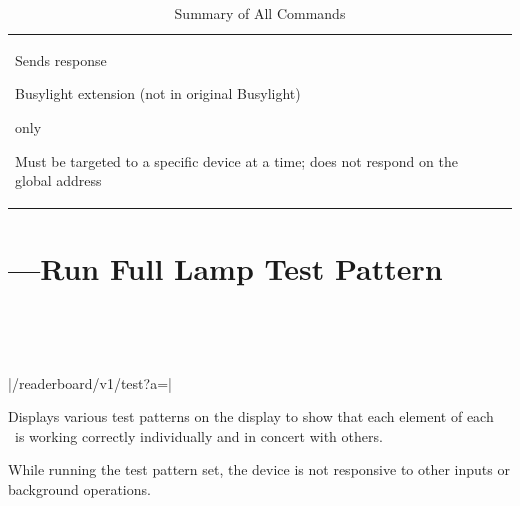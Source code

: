 \begin{table}
\begin{center}
\begin{tabular}{lcll}
{			\noindent[2] Sends response

			\noindent[3] Busylight extension (not in original Busylight)

			\noindent[4] \acronym{USB} only

			\noindent[5] Must be targeted to a specific device at a time; does not respond on the global address}
		\end{tabular}
		\caption{Summary of All Commands\label{tbl:commands}}
	\end{center}
\end{table}


\section{\z{\%}---Run Full Lamp Test Pattern}
\begin{center}
\begin{bytefield}[endianness=little,bitwidth=0.11111\textwidth]{1}
	 \\
\end{bytefield}
\\
\begin{Coding}
	|/readerboard/v1/test?a=|
\end{Coding}
\end{center}

Displays various test patterns on the display to show that each element of each \led\ is working correctly
individually and in concert with others.

While running the test pattern set, the device is not responsive to other inputs or background operations.

